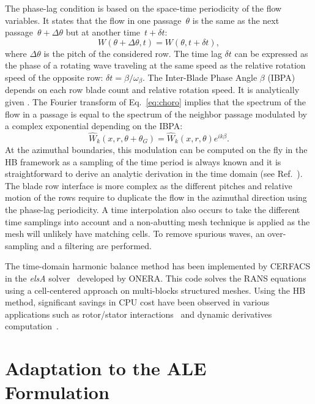 The phase-lag condition is based on the space-time periodicity of the
flow variables. It states that the flow in one passage~$\theta$ is the
same as the next passage~$\theta+\Delta\theta$ but at another
time~$t+\delta t$:
\begin{equation}
  W\left(\theta+\Delta\theta,t \right) = W\left(\theta,t+\delta t \right),
  \label{eq:choro}
\end{equation}
where $\Delta \theta$ is the pitch of the considered row.  The time
lag $\delta t$ can be expressed as the phase of a rotating wave
traveling at the same speed as the relative rotation speed of the
opposite row: $\delta t=\beta/\omega_\beta$.  The Inter-Blade Phase
Angle $\beta$ (IBPA) depends on each row blade count and relative
rotation speed. It is analytically given \citet{Gerolymos1991}.  The Fourier
transform of Eq.~\eqref{eq:choro} implies that the spectrum of the
flow in a passage is equal to the spectrum of the neighbor passage
modulated by a complex exponential depending on the IBPA:
\begin{equation}
  \label{eq:serfourphasetemps}
  \widehat{W}_k(x, r,  \theta+\theta_G)  = {\widehat{W}_k(x, r,
    \theta)e^{i k\beta}}.
\end{equation}
At the azimuthal boundaries, this modulation can be computed on the fly
in the HB framework as a sampling of the time period is always known
and it is straightforward to derive an analytic derivation in the time
domain (see Ref.~\cite{JSicot2012}). The blade row interface is more complex
as the different pitches and relative motion of the rows require to
duplicate the flow in the azimuthal direction using the phase-lag
periodicity. A time interpolation also occurs to take the
different time samplings into account and a non-abutting mesh
technique is applied as the mesh will unlikely have matching
cells. To remove spurious waves, an over-sampling and a filtering are
performed. 

The time-domain harmonic balance method has been implemented 
by CERFACS in the
\emph{elsA} solver~\cite{Cambier2013} developed by ONERA. 
This code solves the RANS equations using a cell-centered
approach on multi-blocks structured meshes.  Using the HB method,
significant savings in CPU cost have been observed in various
applications such as rotor/stator interactions~\cite{JSicot2012}
and dynamic derivatives computation~\cite{CIHassan2011}. 


\section{Adaptation to the ALE Formulation}

